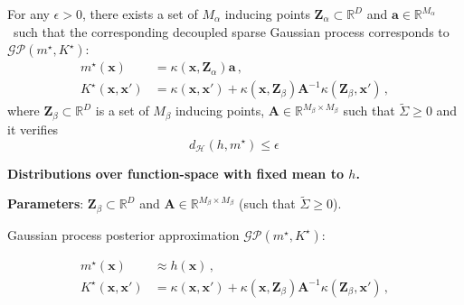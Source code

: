 \documentclass[aspectratio=149]{beamer}
\begin{document}
    \begin{frame}
        For any \(\epsilon > 0\), there exists a set of \(M_\alpha\) inducing points \(\mathbf{Z}_{\alpha} \subset \mathbb{R}^D\) and \(\bm{a} \in \mathbb{R}^{M_\alpha}\)\pause\ such that the corresponding decoupled sparse Gaussian process corresponds to \(\mathcal{GP}(m^\star, K^\star)\):
        \[
            \begin{aligned}
                m^{\star}(\mathbf{x}) &= \kappa(\mathbf{x}, \mathbf{Z}_\alpha)\bm{a}\,, \\
                K^{\star}(\mathbf{x}, \mathbf{x}') &= \kappa(\mathbf{x}, \mathbf{x}') +  \kappa(\mathbf{x}, \mathbf{Z}_\beta)\bm{A}^{-1} \kappa(\mathbf{Z}_\beta, \mathbf{x}')\,,
            \end{aligned}
        \]
        \pause
        where \(\mathbf{Z}_{\beta} \subset \mathbb{R}^D\) is a set of \(M_\beta\) inducing points, \(\bm{A} \in \mathbb{R}^{M_\beta \times M_\beta}\) such that \(\tilde{\Sigma} \geq 0\) and it verifies 
        \[
        d_{\mathcal{H}}(h, m^\star) \leq \epsilon\,
        \]
    \end{frame}
    \begin{frame}
        \begin{center}
            \textbf{Distributions over function-space with fixed mean to \(h\).}
        \end{center}
        \pause
        \begin{center}
        \textbf{Parameters}: \(\mathbf{Z}_{\beta} \subset \mathbb{R}^D\) and \(\bm{A} \in \mathbb{R}^{M_\beta \times M_\beta}\) (such that \(\tilde{\Sigma} \geq 0\)).
        \end{center}
        \pause
        \begin{center}  
        Gaussian process posterior approximation \(\mathcal{GP}(m^\star, K^\star)\):
        \end{center}
        \[
            \begin{aligned}
                m^{\star}(\mathbf{x}) &\approx h(\mathbf{x})\,, \\
                K^{\star}(\mathbf{x}, \mathbf{x}') &=\kappa(\mathbf{x}, \mathbf{x}') +  \kappa(\mathbf{x}, \mathbf{Z}_\beta)\bm{A}^{-1} \kappa(\mathbf{Z}_\beta, \mathbf{x}')\,,
            \end{aligned}
        \]
    \end{frame}
\end{document}
